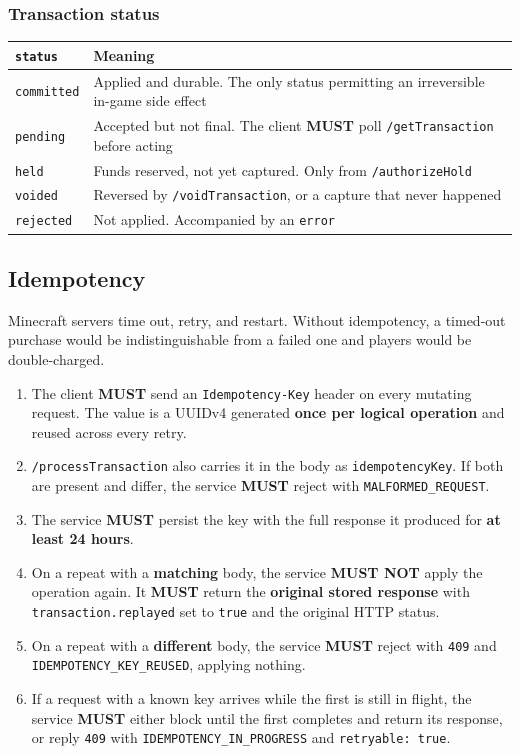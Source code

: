 \documentclass[11pt,a4paper]{article}
\newcommand{\code}[1]{\texttt{\small #1}}
\newcommand{\req}{\textbf{MUST}}
\begin{document}
\subsubsection*{Transaction status}

\begin{tabularx}{\linewidth}{L{2.6cm} X}
\toprule
\code{status} & \textbf{Meaning}\\
\midrule
\code{committed} & Applied and durable. The only status permitting an irreversible in-game side effect\\
\code{pending}   & Accepted but not final. The client \req{} poll \code{/getTransaction} before acting\\
\code{held}      & Funds reserved, not yet captured. Only from \code{/authorizeHold}\\
\code{voided}    & Reversed by \code{/voidTransaction}, or a capture that never happened\\
\code{rejected}  & Not applied. Accompanied by an \code{error}\\
\bottomrule
\end{tabularx}

\subsection{Idempotency}
\label{sec:idempotency}

Minecraft servers time out, retry, and restart. Without idempotency, a timed-out purchase would be
indistinguishable from a failed one and players would be double-charged.

\begin{enumerate}
\item The client \req{} send an \code{Idempotency-Key} header on every mutating request. The value
      is a UUIDv4 generated \textbf{once per logical operation} and reused across every retry.
\item \code{/processTransaction} also carries it in the body as \code{idempotencyKey}. If both are
      present and differ, the service \req{} reject with \code{MALFORMED\_REQUEST}.
\item The service \req{} persist the key with the full response it produced for \textbf{at least 24
      hours}.
\item On a repeat with a \textbf{matching} body, the service \textbf{MUST NOT} apply the operation
      again. It \req{} return the \textbf{original stored response} with
      \code{transaction.replayed} set to \code{true} and the original HTTP status.
\item On a repeat with a \textbf{different} body, the service \req{} reject with \code{409} and
      \code{IDEMPOTENCY\_KEY\_REUSED}, applying nothing.
\item If a request with a known key arrives while the first is still in flight, the service \req{}
      either block until the first completes and return its response, or reply \code{409} with
      \code{IDEMPOTENCY\_IN\_PROGRESS} and \code{retryable: true}.
\end{enumerate}
\end{document}
